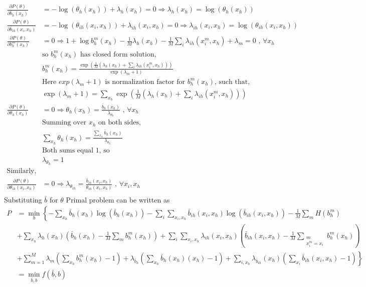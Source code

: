 \documentclass{article}
\begin{document}
\begin{align*}
\frac{\partial P(\theta)}{\partial \bar{b}_h(x_h)}&=-\log(\theta_h(x_h))+\lambda_h(x_h)=0\Rightarrow \lambda_h(x_h)=\log(\theta_h(x_h))\\
\frac{\partial P(\theta)}{\partial \bar{b}_{ih}(x_i,x_h)}&=-\log(\theta_{ih}(x_i,x_h))+\lambda_{ih}(x_i,x_h)=0\Rightarrow \lambda_{ih}(x_i,x_h)=\log(\theta_{ih}(x_i,x_h))\\
\frac{\partial P(\theta)}{\partial {b}_h^m(x_h)}&=0\Rightarrow  1+\log b_h^m(x_h)-\frac{1}{M}\lambda_h(x_h)-\frac{1}{M}\sum_i\lambda_{ih}(x_i^m,x_h)+\lambda_m=0\text{ ,  }\forall x_h\\
&\text{so $b_h^m(x_h)$ has closed form solution,}\\
&b_h^m(x_h)=\frac{\exp(\frac{1}{M}\left(\lambda_h(x_h)+\sum_i \lambda_{ih}(x_i^m,x_h)\right))}{\exp(\lambda_m + 1)}\\
&\text{Here $exp(\lambda_m + 1)$ is normalization factor for $b_h^m(x_h)$, such that,}\\
&\exp(\lambda_m+1)=\sum_{x_h}\exp\left(\frac{1}{M}\left(\lambda_h(x_h)+\sum_i \lambda_{ih}(x_i^m,x_h)\right)\right)\\
\frac{\partial P(\theta)}{\partial \theta_h(x_h)}&=0\Rightarrow \theta_h(x_h)=\frac{\bar{b}_h(x_h)}{\lambda_{\theta_h}}\text{ ,  }\forall x_h\\
&\text{Summing over $x_h$ on both sides,}\\
&\sum_{x_h}\theta_h(x_h)=\frac{\sum_{x_h}\bar{b}_h(x_h)}{\lambda_{\theta_h}}\\
&\text{Both sums equal 1, so}\\
&\lambda_{\theta_h}=1\\
\text{Similarly,}\\
\frac{\partial P(\theta)}{\partial \theta_{ih}(x_i,x_h)}&=0\Rightarrow \lambda_{\theta_{ih}}=\frac{ \bar{b}_{ih}(x_i,x_h)}{\theta_{ih}(x_i,x_h)}\text{ ,  }\forall x_i,x_h\\
\end{align*}
Substituting $\bar{b}$ for $\theta$  Primal problem can be written as
\begin{align*}
P&=\min_{b}\left\{-\sum_{x_h}\bar{b}_h(x_h)\log(\bar{b}_h(x_h))-\sum_i \sum_{x_i,x_h} \bar{b}_{ih}(x_i,x_h)\log(\bar{b}_{ih}(x_i,x_h))-\frac{1}{M}\sum_mH(b_h^m) \right. \\ & \left. +\sum_{x_h}\lambda_h(x_h)\left(\bar{b}_h(x_h)-\frac{1}{M}\sum_m b_h^m(x_h)\right)+\sum_i\sum_{x_i,x_h}\lambda_{ih}(x_i,x_h)\left(\bar{b}_{ih}(x_i,x_h)-\frac{1}{M}\sum_{\substack{m\\ x_i^m=x_i}} b_h^m(x_h)\right)\right. \\ & \left. +\sum_{m=1}^M\lambda_m\left(\sum_{x_h}b_h^m(x_h)-1\right) +\lambda_{\bar{b}_h}\left(\sum_{x_h}\bar{b}_h(x_h)(x_h)-1 \right)+\sum_{i, x_h}\lambda_{\bar{b}_{ih}}(x_h)\left(\sum_{x_i}\bar{b}_{ih}(x_i,x_h)-1\right) \right\} \\&
=\min_{\bar{b}, b} f(\bar{b}, b)
\end{align*}
\end{document}
